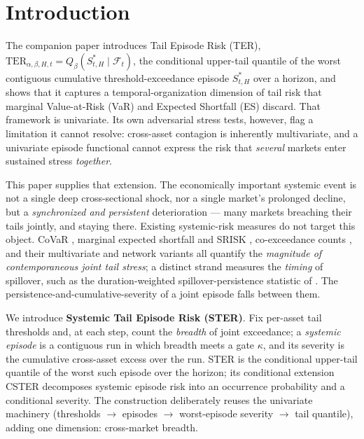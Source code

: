 \documentclass[11pt]{article}
\newcommand{\TER}{\mathrm{TER}}
\begin{document}
\section{Introduction}
The companion paper introduces Tail Episode Risk (TER), $\TER_{\alpha,\beta,H,t}=Q_\beta(S^{*}_{t,H}\mid
\mathcal F_t)$, the conditional upper-tail quantile of the worst contiguous cumulative threshold-exceedance
episode $S^{*}_{t,H}$ over a horizon, and shows that it captures a temporal-organization dimension of tail
risk that marginal Value-at-Risk (VaR) and Expected Shortfall (ES) discard. That framework is univariate.
Its own adversarial stress tests, however, flag a limitation it cannot resolve: cross-asset contagion is
inherently multivariate, and a univariate episode functional cannot express the risk that \emph{several}
markets enter sustained stress \emph{together}.

This paper supplies that extension. The economically important systemic event is not a single deep
cross-sectional shock, nor a single market's prolonged decline, but a \emph{synchronized and persistent}
deterioration --- many markets breaching their tails jointly, and staying there. Existing systemic-risk
measures do not target this object. CoVaR \citep{adrianbrunnermeier2016}, marginal expected shortfall and
SRISK \citep{acharya2017,brownleesengle2017}, co-exceedance counts \citep{baekarolyistulz2003}, and their
multivariate and network variants all quantify the \emph{magnitude of contemporaneous joint tail stress}; a
distinct strand measures the \emph{timing} of spillover, such as the duration-weighted spillover-persistence
statistic of \citet{cosp}. The persistence-and-cumulative-severity of a joint episode falls between them.

We introduce \textbf{Systemic Tail Episode Risk (STER)}. Fix per-asset tail thresholds and, at each step,
count the \emph{breadth} of joint exceedance; a \emph{systemic episode} is a contiguous run in which breadth
meets a gate $\kappa$, and its severity is the cumulative cross-asset excess over the run. STER is the
conditional upper-tail quantile of the worst such episode over the horizon; its conditional extension CSTER
decomposes systemic episode risk into an occurrence probability and a conditional severity. The construction
deliberately reuses the univariate machinery (thresholds $\to$ episodes $\to$ worst-episode severity $\to$
tail quantile), adding one dimension: cross-market breadth.
\end{document}
